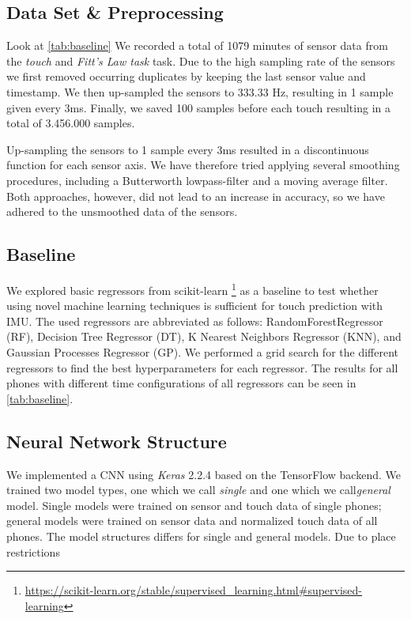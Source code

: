 \subsection{Data Set \& Preprocessing}
\label{sec:prepro}
Look at \cref{tab:baseline}
We recorded a total of 1079 minutes of sensor data from the \textit{touch} and \textit{Fitt's Law task} task. 
Due to the high sampling rate of the sensors we first removed occurring duplicates by keeping the last sensor value and timestamp.
We then up-sampled the sensors to 333.33 Hz, resulting in 1 sample given every 3ms. 
Finally, we saved 100 samples before each touch resulting in a total of 3.456.000 samples.

Up-sampling the sensors to 1 sample every 3ms resulted in a discontinuous function for each sensor axis. 
We have therefore tried applying several smoothing procedures, including a Butterworth lowpass-filter and a moving average filter.
Both approaches, however, did not lead to an increase in accuracy, so we have adhered to the unsmoothed data of the sensors.

\subsection{Baseline}
We explored basic regressors from scikit-learn \footnote{\url{https://scikit-learn.org/stable/supervised\_learning.html\#supervised-learning}} as a baseline to test whether using novel machine learning techniques is sufficient for touch prediction with IMU.
The used regressors are abbreviated as follows: RandomForestRegressor (RF), Decision Tree Regressor (DT), K Nearest Neighbors Regressor (KNN), and Gaussian Processes Regressor (GP).
We performed a grid search for the different regressors to find the best hyperparameters for each regressor.
The results for all phones with different time configurations of all regressors can be seen in \cref{tab:baseline}.

\subsection{Neural Network Structure}
We implemented a CNN using \textit{Keras} 2.2.4 based on the TensorFlow backend. 
We trained two model types, one which we call \textit{single} and one which we call\textit{general} model.
Single models were trained on sensor and touch data of single phones; general models were trained on sensor data and normalized touch data of all phones.
The model structures differs for single and general models.
Due to place restrictions 



